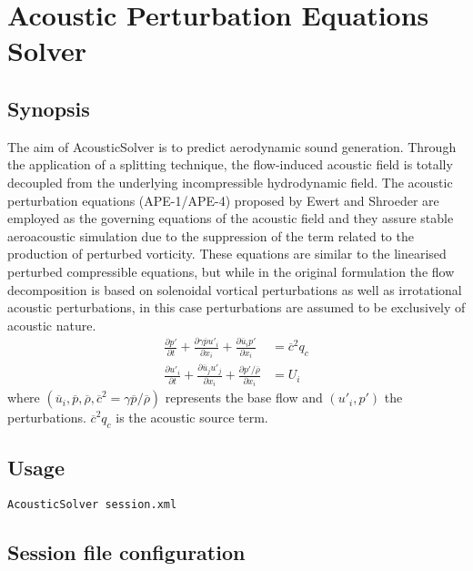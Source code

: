 \chapter{Acoustic Perturbation Equations Solver}

\section{Synopsis}
The aim of AcousticSolver is to predict aerodynamic sound generation. Through
the application of a splitting technique, the flow-induced acoustic field is
totally decoupled from the underlying incompressible hydrodynamic field. The
acoustic perturbation equations (APE-1/APE-4) proposed by Ewert and Shroeder are employed as
the governing equations of the acoustic field and they assure stable
aeroacoustic simulation due to the suppression of the term related to the
production of perturbed vorticity. These equations are similar to the linearised
perturbed compressible equations, but while in the original formulation the flow
decomposition is based on solenoidal vortical perturbations as well as
irrotational acoustic perturbations, in this case perturbations are assumed to
be exclusively of acoustic nature.
\begin{subequations}
    \begin{align*}
        \frac{\partial p'}{\partial t}
        + \frac{\partial \gamma \overline{p} u'_i}{\partial x_i}
        + \frac{\partial \overline{u}_i p'}{\partial x_i}
        &= \overline{c}^2 q_c
        \\
        \frac{\partial u'_i}{\partial t}
        + \frac{\partial \overline{u}_j u'_j}{\partial x_i}
        + \frac{\partial p' / \overline{\rho}}{\partial x_i}
        &= U_i
        \end{align*}
\end{subequations}
where $(\overline{u}_i,\overline{p}, \overline{\rho}, \overline{c}^2 = \gamma \overline{p} / \overline{\rho} )$ represents the base flow and $(u'_i,p')$ the perturbations.
$\overline{c}^2 q_c$ is the acoustic source term.

\section{Usage}
\begin{lstlisting}[style=BashInputStyle]
AcousticSolver session.xml
\end{lstlisting}

\section{Session file configuration}

